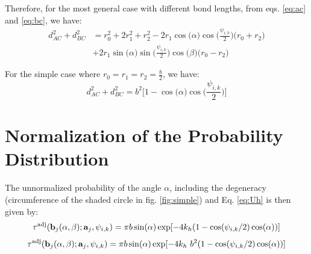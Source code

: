         Therefore, for the most general case with different bond lengths, from eqs. \eqref{eq:ac} and \eqref{eq:bc}, we have:
        \begin{equation}
            \begin{aligned}
                d_{AC}^2 + d_{BC}^2 &= r_0^2 + 2  r_1^2 + r_2^2 - 2  r_1  \cos \big( \alpha \big)  \cos \Big(\displaystyle\frac{\psi_{i,k}}{2}\Big)  \big( r_0 + r_2 \big)\\
                &+ 2  r_1  \sin \big( \alpha \big)  \sin \Big(\displaystyle\frac{\psi_{i,k}}{2}\Big)  \cos \big( \beta \big)  \big( r_0 - r_2 \big)
            \end{aligned}
        \end{equation}

        For the simple case where $r_0 = r_1 = r_2 = \displaystyle\frac{b}{2}$, we have:
        \begin{equation}
        \label{eq:final}
            d_{AC}^2 + d_{BC}^2 = b^2  \Big[ 1 - \cos \big( \alpha \big)  \cos \Big(\displaystyle\frac{\psi_{i,k}}{2}\Big) \Big]
        \end{equation}
    \section{Normalization of the Probability Distribution}
    \label{Appendix C}
    The unnormalized probability of the angle $\alpha$, including the degeneracy (circumference of the shaded circle in fig. \ref{fig:simple}) and Eq. \eqref{eq:Uh} is then given by:
    \ifkhExplicitP
        \begin{equation}
            \label{eq:piTildeAlpha}
            \tau^\text{adj}({\mathbf {b}}_j(\alpha, \beta);{\mathbf {a}}_j,\psi_{i,k})  = \pi b \sin(\alpha) \exp[-4k_h(1 - \cos(\psi_{i,k}/2) \cos(\alpha))]
        \end{equation}
    \else
        \begin{equation}
        \label{eq:piTildeAlpha}
            \tau^\text{adj}({\mathbf {b}}_j(\alpha, \beta);{\mathbf {a}}_j,\psi_{i,k})  = \pi b \sin(\alpha) \exp[-4k_h~b^2 (1 - \cos(\psi_{i,k}/2) \cos(\alpha))]
        \end{equation}
    \fi

